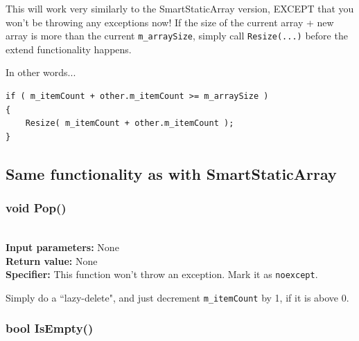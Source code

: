 \documentclass[a4paper,12pt]{book}
\begin{document}
    This will work very similarly to the SmartStaticArray version,
    EXCEPT that you won't be throwing any exceptions now! If the
    size of the current array + new array is more than the current
    \texttt{m\_arraySize}, simply call \texttt{Resize(...)} before
    the extend functionality happens.

    In other words...

\begin{verbatim}
if ( m_itemCount + other.m_itemCount >= m_arraySize )
{
    Resize( m_itemCount + other.m_itemCount );
}
\end{verbatim}


    
    


    \newpage
    \subsection*{Same functionality as with SmartStaticArray}
    
    \hrulefill
    \subsubsection*{void Pop()}

    \begin{framed} ~\\
        \textbf{Input parameters:} None \\
        \textbf{Return value:} None \\
        \textbf{Specifier:} This function won't throw an exception. Mark it as \texttt{noexcept}.
    \end{framed}

    Simply do a ``lazy-delete", and just decrement \texttt{m\_itemCount} by 1,
    if it is above 0.


    \hrulefill
    \subsubsection*{bool IsEmpty()}
\end{document}
